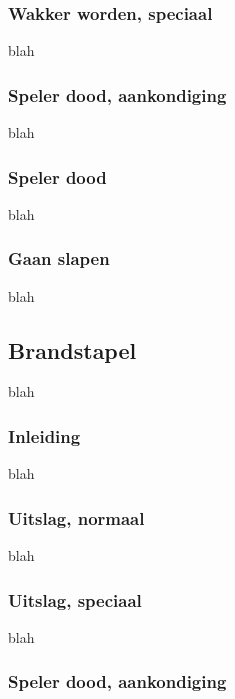 \documentclass[12pt]{article}
\begin{document}
    \subsubsection{Wakker worden, speciaal}
    
      blah
    
    \subsubsection{Speler dood, aankondiging}
    
      blah
    
    \subsubsection{Speler dood}
    
      blah
    
    \subsubsection{Gaan slapen}
    
      blah
  
  \subsection{Brandstapel}
    
      blah
  
    \subsubsection{Inleiding}
    
      blah
    
    \subsubsection{Uitslag, normaal}
    
      blah
    
    \subsubsection{Uitslag, speciaal}
    
      blah
    
    \subsubsection{Speler dood, aankondiging}
    
\end{document}
